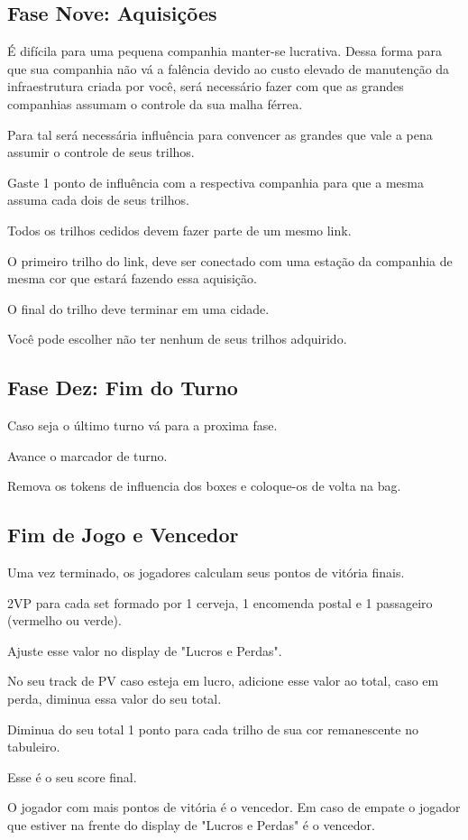 \documentclass[11pt]{article}
\begin{document}
\subsection{Fase Nove: Aquisições}
\label{sec:org2dafef7}

É difícila para uma pequena companhia manter-se lucrativa. Dessa forma para que sua companhia não vá a falência devido ao custo elevado de manutenção da infraestrutura criada por você,
será necessário fazer com que as grandes companhias assumam o controle da sua malha férrea.

Para tal será necessária influência para convencer as grandes que vale a pena assumir o controle de seus trilhos.

Gaste 1 ponto de influência com a respectiva companhia para que a mesma assuma cada dois de seus trilhos.

Todos os trilhos cedidos devem fazer parte de um mesmo link.

O primeiro trilho do link, deve ser conectado com uma estação da companhia de mesma cor que estará fazendo essa aquisição.

O final do trilho deve terminar em uma cidade.

Você pode escolher não ter nenhum de seus trilhos adquirido.

\subsection{Fase Dez: Fim do Turno}
\label{sec:org9b62d94}

Caso seja o último turno vá para a proxima fase.

Avance o marcador de turno.

Remova os tokens de influencia dos boxes e coloque-os de volta na bag.


\subsection{Fim de Jogo e Vencedor}
\label{sec:org8c55b3a}

Uma vez terminado, os jogadores calculam seus pontos de vitória finais.

2VP para cada set formado por 1 cerveja, 1 encomenda postal e 1 passageiro (vermelho ou verde).

Ajuste esse valor no display de "Lucros e Perdas".

No seu track de PV caso esteja em lucro, adicione esse valor ao total, caso em perda, diminua essa valor do seu total.

Diminua do seu total 1 ponto para cada trilho de sua cor remanescente no tabuleiro.

Esse é o seu score final.

O jogador com mais pontos de vitória é o vencedor. Em caso de empate o jogador que estiver na frente do display de "Lucros e Perdas" é o vencedor.
\end{document}

